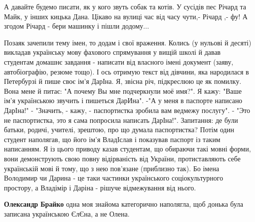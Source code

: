 \begin{itemize}
 

А давайте будемо писати, як у кого звуть собак та котів. У сусідів пес Річард
та Майк, у інших кицька Дана. Цікаво на вулиці час від часу чути,- Річард ,-
фу! А згодом Річард - бери машинку і пішли додому...


 

Позаяк зачепили тему імен, то додам і свої враження. Колись (у нульові й
десяті) викладав українську мову фахового спрямування у вищій школі й давав
студентам домашнє завдання - написати від власного імені документ (заяву,
автобіографію, резюме тощо). І ось отримую текст від дівчини, яка народилася в
Петербурзі й пише своє ім'я ДарІна. Я, звісна річ, підкреслюю це як помилку.
Вона мене й питає: "А почему Вы мне подчеркнули моё имя?". Я кажу: "Ваше ім'я
українською звучить і пишеться ДарИна". -"А у меня в паспорте написано ДарІна!"
- "Значить, - кажу, - паспортистка зробила вам ведмежу послугу". - "Это не
паспортистка, это я сама попросила написать ДарІна!". Запитання: де були
батьки, родичі, учителі, зрештою, про що думала паспортистка? Потім один
студент наполягав, що його ім'я ВладІслав і показував паспорт із таким
написанням. Я із цього приводу казав студентам, що обираючи такі мовні форми,
вони демонструють свою повну відірваність від України, протиставляють себе
українській мові й тому, що з нею пов'язане (приблизно так). Бо імена Володимир
чи Дарина - це таки частинки українського соціокультурного простору, а Владімір
і Даріна - рішуче відмежування від нього.

\begin{itemize}
 
\textbf{Олександр Брайко} одна моя знайома категорично наполягла, щоб донька була записана українською ЄлЄна, а не Олена.


\end{itemize}
\end{itemize}
